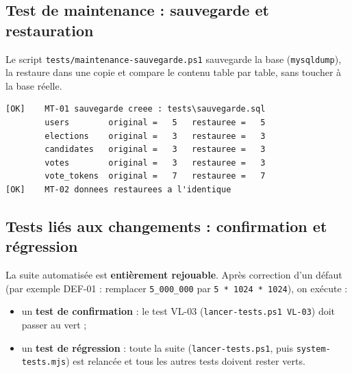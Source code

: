 \documentclass[12pt,a4paper]{report}
\begin{document}
\subsection{Test de maintenance : sauvegarde et restauration}
Le script \texttt{tests/maintenance-sauvegarde.ps1} sauvegarde la base (\texttt{mysqldump}), la restaure dans une copie et compare le contenu table par table, sans toucher à la base réelle.
\begin{lstlisting}[caption={Exécution du test de maintenance}]
[OK]    MT-01 sauvegarde creee : tests\sauvegarde.sql
        users        original =   5   restauree =   5
        elections    original =   3   restauree =   3
        candidates   original =   3   restauree =   3
        votes        original =   3   restauree =   3
        vote_tokens  original =   7   restauree =   7
[OK]    MT-02 donnees restaurees a l'identique
\end{lstlisting}

\subsection{Tests liés aux changements : confirmation et régression}
La suite automatisée est \textbf{entièrement rejouable}. Après correction d'un défaut (par exemple DEF-01 : remplacer \texttt{5\_000\_000} par \texttt{5 * 1024 * 1024}), on exécute :
\begin{itemize}
  \item un \textbf{test de confirmation} : le test VL-03 (\texttt{lancer-tests.ps1 VL-03}) doit passer au vert ;
  \item un \textbf{test de régression} : toute la suite (\texttt{lancer-tests.ps1}, puis \texttt{system-tests.mjs}) est relancée et tous les autres tests doivent rester verts.
\end{itemize}

\end{document}
